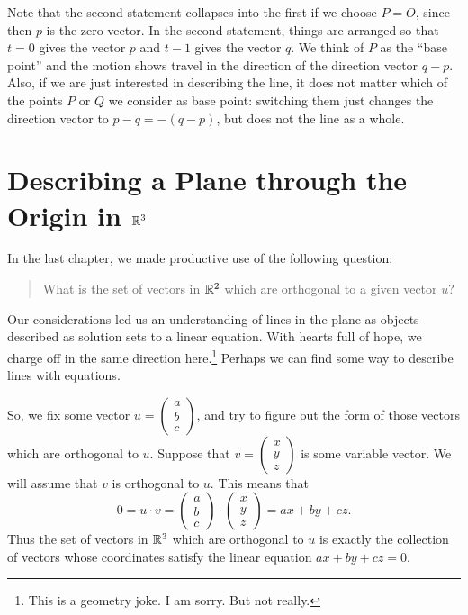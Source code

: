 \documentclass[00-livre-main.tex]{subfiles}
\begin{document}
Note that the second statement collapses into the first if we choose $P=O$, since then $p$ is the zero vector.
In the second statement, things are arranged so that $t=0$ gives the vector $p$ and $t-1$ gives the vector $q$. We think of $P$ as the ``base point'' and the motion shows travel in the direction of the direction vector $q-p$.
Also, if we are just interested in describing the line, it does not matter which of the points $P$ or $Q$ we consider as base point: switching them just changes the direction vector to $p-q = -(q-p)$, but does not the line as a whole.


\section*{Describing a Plane through the Origin in $\mathbb{R}^3$}



In the last chapter, we made productive use of the following question:
\begin{quote}
What is the set of vectors in $\mathbb{R}^2$ which are orthogonal to a given vector $u$?
\end{quote}
Our considerations led us an understanding of lines in the plane as objects described as solution sets to a linear equation. With hearts full of hope, we charge off in the same direction here.\footnote{This is a geometry joke. I am sorry. But not really.} Perhaps we can find some way to describe lines with equations.

So, we fix some vector $u = \left(\begin{smallmatrix} a\\ b \\ c\end{smallmatrix}\right)$, and try to figure out the form of those vectors which are orthogonal to $u$. Suppose that $v= \left( \begin{smallmatrix} x \\ y \\ z \end{smallmatrix}\right)$ is some variable vector. We will assume that $v$ is orthogonal to $u$. This means that 
\[
0 = u\cdot v = \begin{pmatrix} a \\ b \\ c \end{pmatrix} \cdot \begin{pmatrix} x\\y\\z\end{pmatrix} = ax + by +cz.
\]
Thus the set of vectors in $\mathbb{R}^3$ which are orthogonal to $u$ is exactly the collection of vectors whose coordinates satisfy the linear equation $ax+by+cz=0$.
\end{document}
